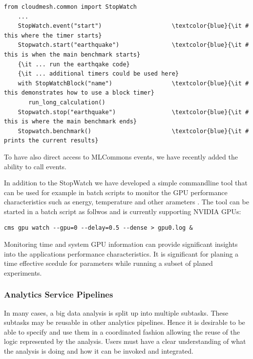 \documentclass[utf8]{FrontiersinVancouver} %
\begin{document}
{\footnotesize
\begin{Verbatim}[commandchars=\\\{\}]
    from cloudmesh.common import StopWatch 
    ...
    StopWatch.event("start")                    \textcolor{blue}{\it # this where the timer starts}
    Stopwatch.start("earthquake")               \textcolor{blue}{\it # this is when the main benchmark starts}
    {\it ... run the earthqake code}
    {\it ... additional timers could be used here}
    with StopWatchBlock("name")                 \textcolor{blue}{\it # this demonstrates how to use a block timer}
       run_long_calculation()
    Stopwatch.stop("earthquake")                \textcolor{blue}{\it # this is where the main benchmark ends}
    Stopwatch.benchmark()                       \textcolor{blue}{\it # prints the current results}
\end{Verbatim}
}

To have also direct access to MLCommons events, we have recently added
the ability to call events.


In addition to the StopWatch we have developed a simple commandline
tool that can be used for example in batch scripts to monitor the GPU
performance characteristics such as energy, temperature and other
arameters \citep{cloudmesh-gpu}. The tool
can be started in a batch script as follwos and is currently
supporting NVIDIA GPUs:

{\footnotesize
\begin{Verbatim}[commandchars=\\\{\}]
    cms gpu watch --gpu=0 --delay=0.5 --dense > gpu0.log &
\end{Verbatim}
}


Monitoring time and system GPU information can provide significant
insights into the applications performance characteristics. It is
significant for planing a time effective scedule for parameters while
running a subset of planed experiments.



\subsubsection{Analytics Service Pipelines}

In many cases, a big data analysis is split up into multiple
subtasks. These subtasks may be reusable in other analytics
pipelines. Hence it is desirable to be able to specify and use them in
a coordinated fashion allowing the reuse of the logic represented by
the analysis. Users must have a clear understanding of what the
analysis is doing and how it can be invoked and integrated.
\end{document}
